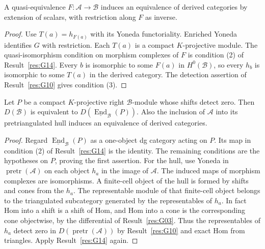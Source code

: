 \begin{corollary}\label{res:G15}
A quasi-equivalence \(F:\mathcal A\to\mathcal B\) induces an
equivalence of derived categories by extension of scalars, with
restriction along \(F\) as inverse.
\end{corollary}
\begin{proof}
Use \(T(a)=h_{F(a)}\) with its Yoneda functoriality. Enriched Yoneda
identifies \(G\) with restriction. Each \(T(a)\) is a compact
\(K\)-projective module. The quasi-isomorphism condition on
morphism complexes of \(F\) is condition (2) of
Result~\ref{res:G14}. Every \(b\) is isomorphic to some \(F(a)\)
in \(H^0(\mathcal B)\), so every \(h_b\) is isomorphic to
some \(T(a)\) in the derived category. The detection assertion
of Result~\ref{res:G10} gives condition (3).
\end{proof}

\begin{corollary}\label{res:G16}
Let \(P\) be a compact \(K\)-projective right \(\mathcal B\)-module
whose shifts detect zero. Then \(D(\mathcal B)\) is equivalent
to \(D(\underline{\operatorname{End}}_\mathcal B(P))\).
Also the inclusion of \(\mathcal A\) into its pretriangulated
hull induces an equivalence of derived categories.
\end{corollary}
\begin{proof}
Regard \(\underline{\operatorname{End}}_\mathcal B(P)\) as a
one-object dg category acting on \(P\). Its map in condition (2)
of Result~\ref{res:G14} is the identity. The remaining conditions
are the hypotheses on \(P\), proving the first assertion.
For the hull, use Yoneda in \(\operatorname{pretr}(\mathcal A)\)
on each object \(h_a\) in the image of \(\mathcal A\).
The induced maps of morphism complexes are isomorphisms.
A finite-cell object of the hull is formed by shifts and cones
from the \(h_a\). The representable module of that finite-cell
object belongs to the triangulated subcategory generated by
the representables of \(h_a\). In fact Hom into a shift is a
shift of Hom, and Hom into a cone is the corresponding cone
objectwise, by the differential of Result~\ref{res:G03}.
Thus the representables of \(h_a\) detect zero in
\(D(\operatorname{pretr}(\mathcal A))\) by Result~\ref{res:G10}
and exact Hom from triangles. Apply Result~\ref{res:G14} again.
\end{proof}

